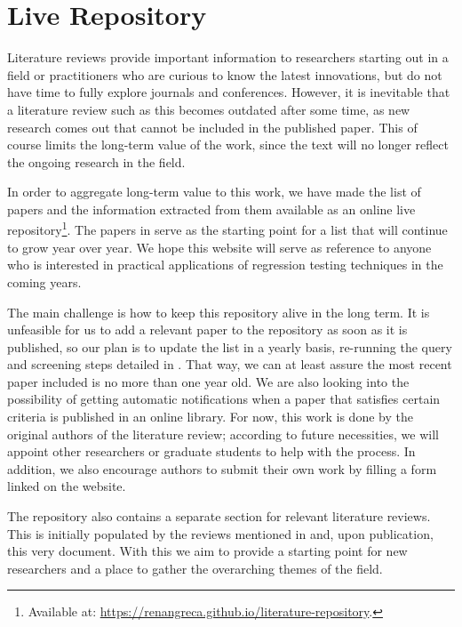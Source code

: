 \chapter{Live Repository}\label{chap:live}

Literature reviews provide important information to researchers starting out in a field or practitioners who are curious to know the latest innovations, but do not have time to fully explore journals and conferences.
However, it is inevitable that a literature review such as this becomes outdated after some time, as new research comes out that cannot be included in the published paper.
This of course limits the long-term value of the work, since the text will no longer reflect the ongoing research in the field.

In order to aggregate long-term value to this work, we have made the list of papers and the information extracted from them available as an online live repository\footnote{Available at: \url{https://renangreca.github.io/literature-repository}.}.
The papers in  serve as the starting point for a list that will continue to grow year over year.
We hope this website will serve as reference to anyone who is interested in practical applications of regression testing techniques in the coming years.

The main challenge is how to keep this repository alive in the long term.
It is unfeasible for us to add a relevant paper to the repository as soon as it is published, so our plan is to update the list in a yearly basis, re-running the query and screening steps detailed in .
That way, we can at least assure the most recent paper included is no more than one year old.
We are also looking into the possibility of getting automatic notifications when a paper that satisfies certain criteria is published in an online library.
For now, this work is done by the original authors of the literature review; according to future necessities, we will appoint other researchers or graduate students to help with the process.
In addition, we also encourage authors to submit their own work by filling a form linked on the website.

The repository also contains a separate section for relevant literature reviews.
This is initially populated by the reviews mentioned in  and, upon publication, this very document.
With this we aim to provide a starting point for new researchers and a place to gather the overarching themes of the field.

